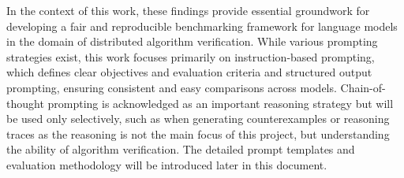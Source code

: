 In the context of this work, these findings provide essential groundwork for developing a fair and reproducible benchmarking framework for language models in the domain of distributed algorithm verification. While various prompting strategies exist, this work focuses primarily on instruction-based prompting, which defines clear objectives and evaluation criteria and structured output prompting, ensuring consistent and easy comparisons across models. Chain-of-thought prompting is acknowledged as an important reasoning strategy but will be used only selectively, such as when generating counterexamples or reasoning traces as the reasoning is not the main focus of this project, but understanding the ability of algorithm verification. The detailed prompt templates and evaluation methodology will be introduced later in this document.

